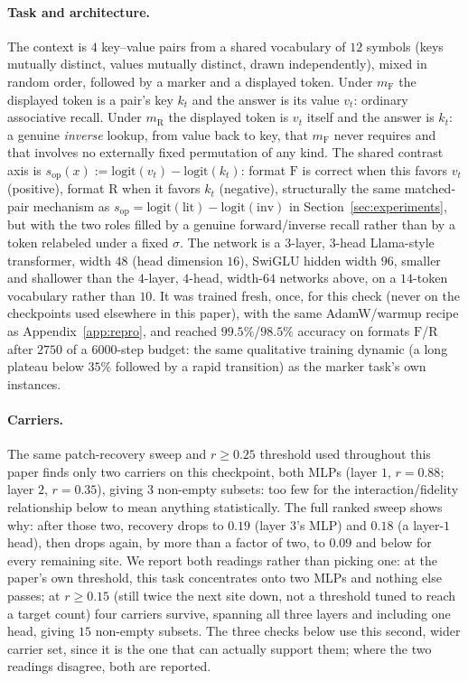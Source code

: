 \documentclass[11pt,a4paper]{article}
\begin{document}
\paragraph{Task and architecture.} The context is $4$ key--value pairs from a
shared vocabulary of $12$ symbols (keys mutually distinct, values mutually
distinct, drawn independently), mixed in random order, followed by a marker
and a displayed token. Under $m_{\mathrm F}$ the displayed token is a pair's
key $k_t$ and the answer is its value $v_t$: ordinary associative recall.
Under $m_{\mathrm R}$ the displayed token is $v_t$ itself and the answer is
$k_t$: a genuine \emph{inverse} lookup, from value back to key, that
$m_{\mathrm F}$ never requires and that involves no externally fixed
permutation of any kind. The shared contrast axis is
$s_{\mathrm{op}}(x):=\mathrm{logit}(v_t)-\mathrm{logit}(k_t)$: format
$\mathrm F$ is correct when this favors $v_t$ (positive), format $\mathrm R$
when it favors $k_t$ (negative), structurally the same matched-pair
mechanism as $s_{\mathrm{op}}=\mathrm{logit}(\mathrm{lit})-\mathrm{logit}
(\mathrm{inv})$ in Section~\ref{sec:experiments}, but with the two roles
filled by a genuine forward/inverse recall rather than by a token relabeled
under a fixed $\sigma$. The network is a $3$-layer, $3$-head Llama-style
transformer, width $48$ (head dimension $16$), SwiGLU hidden width $96$,
smaller and shallower than the $4$-layer, $4$-head, width-$64$ networks
above, on a $14$-token vocabulary rather than $10$. It was trained fresh, once,
for this check (never on the checkpoints used elsewhere in this paper), with
the same AdamW/warmup recipe as Appendix~\ref{app:repro}, and reached
$99.5\%$/$98.5\%$ accuracy on formats $\mathrm F$/$\mathrm R$ after $2750$ of
a $6000$-step budget: the same qualitative training dynamic
(a long plateau below $35\%$ followed by a rapid transition) as the marker
task's own instances.

\paragraph{Carriers.} The same patch-recovery sweep and $r\ge0.25$ threshold
used throughout this paper finds only two carriers on this checkpoint, both
MLPs (layer $1$, $r=0.88$; layer $2$, $r=0.35$), giving $3$ non-empty subsets:
too few for the interaction/fidelity relationship below to mean anything
statistically. The full ranked sweep shows why: after those two, recovery
drops to $0.19$ (layer $3$'s MLP) and $0.18$ (a layer-$1$ head), then drops
again, by more than a factor of two, to $0.09$ and below for every remaining
site. We report both readings rather than picking one: at the paper's own
threshold, this task concentrates onto two MLPs and nothing else passes; at
$r\ge0.15$ (still twice the next site down, not a threshold tuned to reach
a target count) four carriers survive, spanning all three layers and
including one head, giving $15$ non-empty subsets. The three checks below use
this second, wider carrier set, since it is the one that can actually support
them; where the two readings disagree, both are reported.
\end{document}
